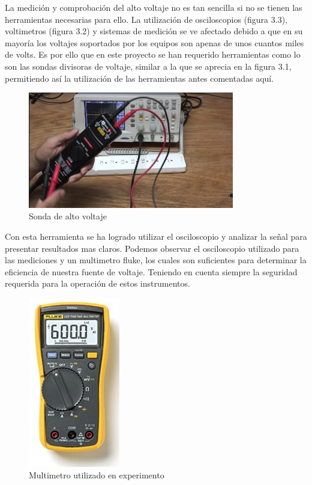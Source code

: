 La medición y comprobación del alto voltaje no es tan sencilla si no se tienen las herramientas necesarias para ello. La utilización de osciloscopios (figura 3.3), voltimetros (figura 3.2) y sistemas de medición se ve afectado debido a que en su mayoría los voltajes soportados por los equipos son apenas de unos cuantos miles de volts. Es por ello que en este proyecto se han requerido herramientas como lo son las sondas divisoras de voltaje, similar a la que se aprecia en la figura 3.1, permitiendo así la utilización de las herramientas antes comentadas aquí.\\

\begin{figure}[H]
\centering
\includegraphics[width=9cm]{Capitulo3/figs/sonda.png}
\caption{Sonda de alto voltaje}
\end{figure}

Con esta herramienta se ha logrado utilizar el osciloscopio y analizar la señal para presentar resultados mas claros. Podemos observar el osciloscopio utilizado para las mediciones y un multimetro fluke, los cuales son suficientes para determinar la eficiencia de nuestra fuente de voltaje. Teniendo en cuenta siempre la seguridad requerida para la operación de estos instrumentos.


\begin{figure}[H]
\centering
\includegraphics[width=4cm]{Capitulo3/figs/multim.png}
\caption{Multimetro utilizado en experimento}
\end{figure}

